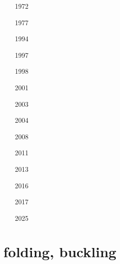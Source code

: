 \begin{small}
\begin{itemize}
\item[1972]
\item[1977]
\\
\item[1994]
\item[1997]
\item[1998]
\item[2001]
\item[2003]
\item[2004]
\item[2008]
\item[2011]
\\
\item[2013]
\item[2016]
\\
\item[2017]
\item[2025]
\end{itemize}
\end{small}



\section{folding, buckling} 

